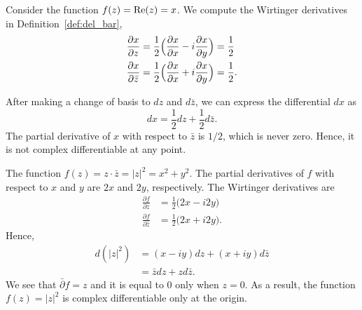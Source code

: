
\begin{example}
	Consider the function $f(z) = \operatorname{\mathrm{Re}}(z) = x$. We compute the Wirtinger derivatives in Definition~\ref{def:del_bar},
	\begin{align*}
	\frac{\partial x}{\partial z} &= 
	\frac{1}{2} \Big( \frac{\partial x}{\partial x} - i \frac{\partial x}{\partial y}\Big) = \frac{1}{2} \\ 
	\frac{\partial x}{\partial \bar{z}} &= \frac{1}{2} \Big( \frac{\partial x}{\partial x} + i \frac{\partial x}{\partial y}\Big) = \frac{1}{2}.
	\end{align*}
	
	
	After making a change of basis to $dz$ and $d\bar{z}$, we can express the differential $dx$ as
	$$
	dx = \frac{1}{2} dz + \frac{1}{2} d\bar{z}.
	$$
	The partial derivative of $x$ with respect to $\bar{z}$ is $1/2$, which is never zero. Hence, it is not complex differentiable at any point.
\end{example}

\begin{example}
	The function $f(z) = z\cdot \bar{z} = |z|^2 = x^2+y^2$. The partial derivatives of $f$ with respect to $x$ and $y$ are $2x$ and $2y$, respectively. The Wirtinger derivatives are
	\begin{align*}
	\frac{\partial f}{\partial z} &= \frac{1}{2} \big( 2x -i 2y\big) \\
	\frac{\partial f}{\partial \bar{z}} &=
	\frac{1}{2} \big( 2x + i2y\big). 
	\end{align*}
	Hence,
	\begin{align*}
		d (|z|^2) & = (x-iy)dz + (x+iy) d\bar{z}  \\
		&= \bar{z} dz + z d\bar{z}.
	\end{align*}
	We see that  $\bar{\partial} f=z$ and it is equal to 0 only when $z=0$. As a result, the function $f(z) = |z|^2$ is complex differentiable only at the origin. \label{ex:x_square_y_square}
\end{example}




